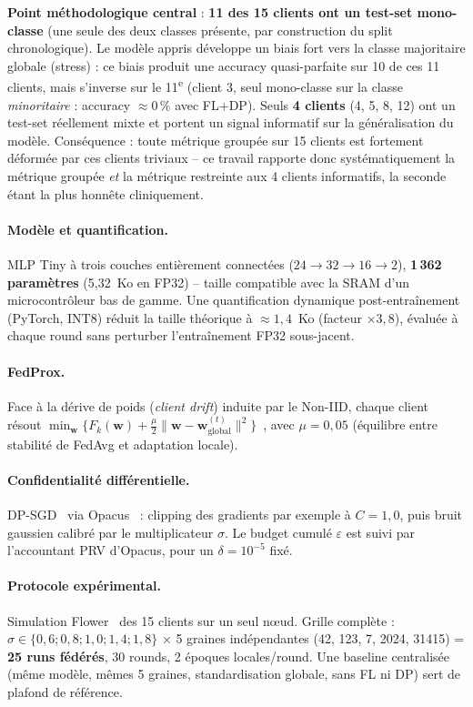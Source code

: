 \documentclass{acmart}
\begin{document}
\textbf{Point méthodologique central} : \textbf{11 des 15 clients ont un test-set
mono-classe} (une seule des deux classes présente, par construction du split
chronologique). Le modèle appris développe un biais fort vers la classe majoritaire
globale (stress) : ce biais produit une accuracy quasi-parfaite sur 10 de ces 11
clients, mais s'inverse sur le 11\textsuperscript{e} (client 3, seul mono-classe sur la
classe \emph{minoritaire} : accuracy $\approx0\,\%$ avec FL+DP). Seuls \textbf{4
clients} (4, 5, 8, 12) ont un test-set réellement mixte et portent un signal
informatif sur la généralisation du modèle. Conséquence : toute métrique groupée sur
15 clients est fortement déformée par ces clients triviaux -- ce travail rapporte donc
systématiquement la métrique groupée \emph{et} la métrique restreinte aux 4 clients
informatifs, la seconde étant la plus honnête cliniquement.

\paragraph{Modèle et quantification.} MLP Tiny à trois couches entièrement connectées
($24\to32\to16\to2$), \textbf{1\,362 paramètres} (5,32~Ko en FP32) -- taille
compatible avec la SRAM d'un microcontrôleur bas de gamme. Une quantification
dynamique post-entraînement (PyTorch, INT8) réduit la taille théorique à
$\approx1{,}4$~Ko (facteur $\times3{,}8$), évaluée à chaque round sans perturber
l'entraînement FP32 sous-jacent.

\paragraph{FedProx.} Face à la dérive de poids (\textit{client drift}) induite par le
Non-IID, chaque client résout $\min_{\mathbf w}\{F_k(\mathbf w) + \frac{\mu}{2}\|\mathbf
w - \mathbf w^{(t)}_{\text{global}}\|^2\}$~\cite{li2020fedprox}, avec $\mu=0{,}05$
(équilibre entre stabilité de FedAvg et adaptation locale).

\paragraph{Confidentialité différentielle.} DP-SGD~\cite{abadi2016deep} via
Opacus~\cite{opacus} : clipping des gradients par exemple à $C=1{,}0$, puis bruit
gaussien calibré par le multiplicateur $\sigma$. Le budget cumulé $\varepsilon$ est
suivi par l'accountant PRV d'Opacus, pour un $\delta=10^{-5}$ fixé.

\paragraph{Protocole expérimental.} Simulation Flower~\cite{beutel2020flower} des
15 clients sur un seul nœud. Grille complète : $\sigma\in\{0{,}6;0{,}8;1{,}0;1{,}4;1{,}8\}$
$\times$ 5 graines indépendantes (42, 123, 7, 2024, 31415) = \textbf{25 runs
fédérés}, 30 rounds, 2 époques locales/round. Une baseline centralisée (même modèle,
mêmes 5 graines, standardisation globale, sans FL ni DP) sert de plafond de référence.
\end{document}
